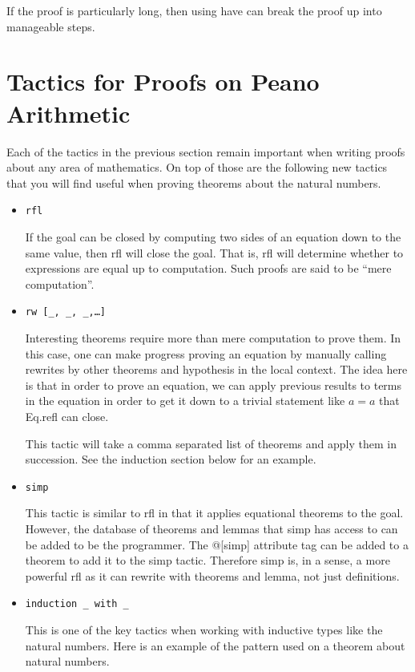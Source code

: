 \documentclass[12pt]{article}
\begin{document}
\begin{itemize}
  If the proof is particularly long, then using have can break the proof up into manageable steps.
  
\section*{Tactics for Proofs on Peano Arithmetic}

Each of the tactics in the previous section remain important when writing proofs about any area of mathematics. On top of those are the following new tactics that you will find useful when proving theorems about the natural numbers.

\begin{itemize}
\item \texttt{rfl}

If the goal can be closed by computing two sides of an equation down to the same value, then rfl will close the goal. That is, rfl will determine whether to expressions are equal up to computation. Such proofs are said to be ``mere computation''. 

\item \texttt{rw [\_, \_, \_,\dots]}

Interesting theorems require more than mere computation to prove them. In this case, one can make progress proving an equation by manually calling rewrites by other theorems and hypothesis in the local context. The idea here is that in order to prove an equation, we can apply previous results to terms in the equation in order to get it down to a trivial statement like $a=a$ that Eq.refl can close. 

This tactic will take a comma separated list of theorems and apply them in succession. See the induction section below for an example.


\item \texttt{simp}

This tactic is similar to rfl in that it applies equational theorems to the goal. However, the database of theorems and lemmas that simp has access to can be added to be the programmer. The @[simp] attribute tag can be added to a theorem to add it to the simp tactic. Therefore simp is, in a sense, a more powerful rfl as it can rewrite with theorems and lemma, not just definitions. 


\item \texttt{induction \_ with \_ }

This is one of the key tactics when working with inductive types like the natural numbers. Here is an example of the pattern used on a theorem about natural numbers. 


\end{itemize}
\end{itemize}
\end{document}
